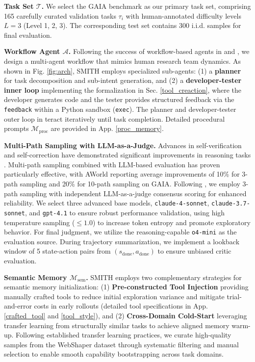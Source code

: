 \documentclass{article} %
\begin{document}
\textbf{Task Set $\mathcal{T}$.} We select the GAIA benchmark \citep{mialon2023gaia} as our primary task set, comprising 165 carefully curated validation tasks $\tau_i$ with human-annotated difficulty levels $L = 3$ (Level 1, 2, 3). The corresponding test set contains 300 i.i.d. samples for final evaluation.

\textbf{Workflow Agent $\mathcal{A}$.} Following the success of workflow-based agents in \citet{hu2025owl} and \citet{zhu2025oagents}, we design a multi-agent workflow that mimics human research team dynamics. As shown in Fig. \ref{fig:arch}, SMITH employs specialized sub-agents: (1) a \textbf{planner} for task decomposition and sub-intent generation, and (2) a \textbf{developer-tester inner loop} implementing the formalization in Sec. \ref{tool_creaction}, where the developer generates code and the tester provides structured feedback via the \texttt{feedback} within a Python sandbox (\texttt{exec}). The planner and developer-tester outer loop in teract iteratively until task completion. Detailed procedural prompts $\mathcal{M}_{\text{proc}}$ are provided in App. \ref{proc_memory}.

\textbf{Multi-Path Sampling with LLM-as-a-Judge.} Advances in self-verification and self-correction have demonstrated significant improvements in reasoning tasks \citep{shinn2024reflexion, chen2025sets}. Multi-path sampling combined with LLM-based evaluation has proven particularly effective, with AWorld \citep{yu2025aworld} reporting average improvements of 10\% for 3-path sampling and 20\% for 10-path sampling on GAIA. Following \citet{chai2025scimaster,yu2025aworld}, we employ 3-path sampling with independent LLM-as-a-judge consensus scoring for enhanced reliability. We select three advanced base models, \texttt{claude-4-sonnet}, \texttt{claude-3.7-sonnet}, and \texttt{gpt-4.1} to ensure robust performance validation, using high temperature sampling ($\le 1.0$) to increase token entropy and promote exploratory behavior. For final judgment, we utilize the reasoning-capable \texttt{o4-mini} as the evaluation source. During trajectory summarization, we implement a lookback window of 5 state-action pairs from $(s_{\text{done}}, a_{\text{done}})$ to ensure unbiased critic evaluation.

\textbf{Semantic Memory $\mathcal{M}_{\text{sem}}$.} SMITH employs two complementary strategies for semantic memory initialization: (1) \textbf{Pre-constructed Tool Injection} providing manually crafted tools to reduce initial exploration variance and mitigate trial-and-error costs in early rollouts (detailed tool specifications in App. \ref{crafted_tool} and \ref{tool_style}), and (2) \textbf{Cross-Domain Cold-Start} leveraging transfer learning from structurally similar tasks to achieve aligned memory warm-up. Following established transfer learning practices, we curate high-quality samples from the WebShaper dataset \citep{tao2025webshaper} through systematic filtering and manual selection to enable smooth capability bootstrapping across task domains.
\end{document}
